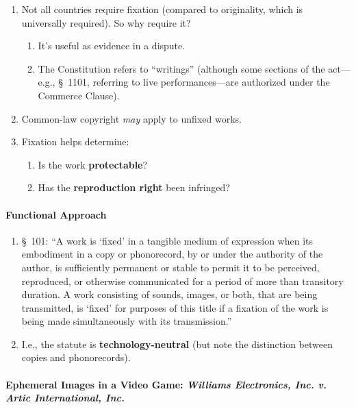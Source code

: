\begin{enumerate}
    \item Not all countries require fixation (compared to originality, which 
    is universally required). So why require it?
    \begin{enumerate}
        \item It's useful as evidence in a dispute.
        \item The Constitution refers to ``writings'' (although some sections 
        of the act---e.g., \S\ 1101, referring to live performances---are 
        authorized under the Commerce Clause).
    \end{enumerate}
    \item Common-law copyright \emph{may} apply to unfixed works.
    \item Fixation helps determine:
    \begin{enumerate}
        \item Is the work \textbf{protectable}?
        \item Has the \textbf{reproduction right} been infringed?
    \end{enumerate}
\end{enumerate}

\paragraph{Functional Approach}

\begin{enumerate}
    \item \S\ 101: ``A work is `fixed' in a tangible medium of expression when 
    its embodiment in a copy or phonorecord, by or under the authority of the 
    author, is sufficiently permanent or stable to permit it to be perceived, 
    reproduced, or otherwise communicated for a period of more than transitory 
    duration. A work consisting of sounds, images, or both, that are being 
    transmitted, is `fixed' for purposes of this title if a fixation of the 
    work is being made simultaneously with its transmission.''
    \item I.e., the statute is \textbf{technology-neutral} (but note the 
    distinction between copies and phonorecords).
\end{enumerate}

\paragraph{Ephemeral Images in a Video Game: \emph{Williams Electronics, Inc. 
v. Artic International, Inc.}}

